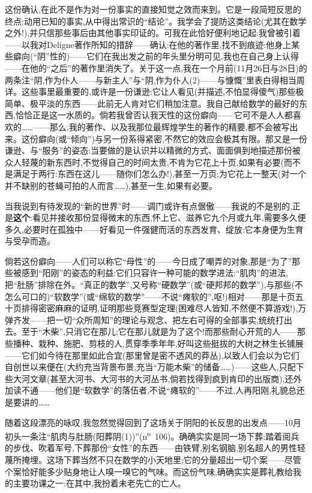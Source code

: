 这份确认,在此不是作为对一份事实的直接知觉之效而来到。它是一段简短反思的终点:动用已知的事实,从中得出常识的“结论”。我学会了提防这类结论(尤其在数学之外!),并只信那些事后由其他事实印证的\dmark{}。可我在此恰好便利地记起:我曾被引着——以我对Deligne著作所知的措辞——确认:在他的著作里,找不到痕迹:他身上某些癖向(“阴”性的)——它们在我出发之前的年头里分明可见,我也在自己身上认得——在他的“之后”的著作里消失了。关于这一点,我在一个月前(11月26日与28日)的两条注“阴,作为仆人——与新主人”与“阴,作为仆人(2)——与慷慨”里表白得相当周详。这些事里最重要的,或许是一份谦逊:它让人看见(并描述,不怕显得傻气)那些极简单、极平淡的东西——此前无人肯对它们稍加注意。我自己献给数学的最好的东西,恰恰正是这一水质的。倘若我曾否认我天性的这份癖向——它可不是人人都喜欢的……——那么,我的著作、以及我那位最辉煌学生的著作的精要,都不会被写出来。这份癖向(或“倾向”)与另一份系得紧密,不然它的效应会极其有限。那又是一份谦逊、与“服务”的姿态:当要做的是认识并以精微的方式、面面俱到地描述那份被众人轻蔑的新东西时,不觉得自己的时间太贵,不肯为它花上十页,如果有必要(而不是满足于两行:东西在这儿——随你们怎么办!),甚至一万页;为它花上一整天(对一个并不缺别的苍蝇可拍的人而言……),甚至一生,如果有必要。

当我说到有待发现的“新的世界”时——调门或许有点倨傲——我说的不是别的,正是\textbf{这个}:看见并接收那份显得微末的东西,怀上它、滋养它九个月或九年,需要多久便多久,必要时在孤独中——好看见一件强健而活的东西发育、绽放:它本身便为生育与受孕而造。

倘若这份癖向——人们可以称它“母性”的——今日成了嘲弄的对象,那是“为了”那些被感到“阳刚”的姿态的利益:它们只容许一种可能的数学进法:“肌肉”的进法,把“肚肠”排除在外。“真正的数学”,又号称“硬数学”(或“硬邦邦的数学”),与那些(不怎么可口的)“软数学”(或“绵软的数学”——不说“瘫软的”,呕!)相对——\dmark{}那是十页五十页排得密密麻麻的证明,证明那些竞赛型定理(困难尽人皆知,不然便不算游戏!),万弹齐发——把一切“众所周知”的理论与观念、把左右可得的全部事实,统统打出去。至于“木柴”,只消它在那儿;它在那儿就是为了这个!而那些耐心开荒的人——那些播种、栽种、施肥、剪枝的人,贯穿季季年年,好叫这些挺拔的大树之林生长铺展——它们如今待在那里如此合宜(那里曾是密不透风的莽丛),以致人们会以为它们自创世以来便在(大约充当背景布景,充当“万能木柴”的储备……)——这些人,只配下些大河文章(甚至大河书、大河书的大河丛书,倘若找得到疯到肯印的出版商),还外加读不通——他们是“软数学”的落伍者,不说“瘫软的”——不过,人再阳刚,礼貌总还是要讲的……

随着这段漂亮的咏叹,我忽然觉得回到了这场关于阴阳的长反思的出发点——10月初头一条注“肌肉与肚肠(阳葬阴(1))”(n\textsuperscript{o}~106)。确确实实是同一场下葬:踏着阅兵的步伐、吹着军号,下葬那份“女性”的东西——由铁臂,别名钢脑,别名超人的男性轻蔑所掩埋。这场下葬当然不只在数学的小天地里;它的分量超出一切个案——尽管个案恰好能多少贴身地让人嗅一嗅它的气味。而这份气味,确确实实是葬礼教给我的主要功课之一:在其中,我扮着未老先亡的亡人。

